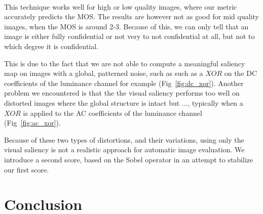 \documentclass{article}
\begin{document}

\paragraph*{}
This technique works well for high or low quality images, where our metric accurately predicts the MOS. The results are however not as good for mid quality images, when the MOS is around 2-3. Because of this, we can only tell that an image is either fully confidential or not very to not confidential at all, but not to which degree it is confidential.

This is due to the fact that we are not able to compute a meaningful saliency map on images with a global, patterned noise, such as such as a $XOR$ on the DC coefficients of the luminance channel for example (Fig~\ref{fig:dc_xor}). Another problem we encountered is that the the visual saliency performs too well on distorted images where the global structure is intact but ..., typically when a $XOR$ is applied to the AC coefficients of the luminance channel (Fig~\ref{fig:ac_xor}).

Because of these two types of distortions, and their variations, using only the visual saliency is not a realistic approach for automatic image evaluation. We introduce a second score, based on the Sobel operator in an attempt to stabilize our first score.



\section{Conclusion}
\label{sec:conclusion}

\newpage


\end{document}
